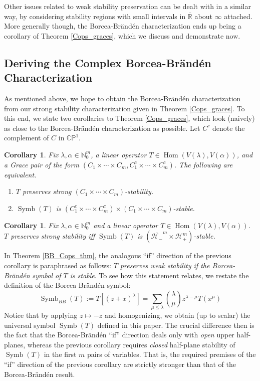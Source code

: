 \documentclass{article}
\newtheorem{corollary}[theorem]{Corollary}
\theoremstyle{definition}
\theoremstyle{plain}
\newcommand{\R}{\mathbb{R}}
\newcommand{\N}{\mathbb{N}}
\newcommand{\CP}{\mathbb{CP}}
\newcommand{\UHP}{\mathcal{H}_+}
\newcommand{\LHP}{\mathcal{H}_-}
\DeclareMathOperator{\Symb}{Symb}
\DeclareMathOperator{\Hom}{Hom}
\begin{document}
Other issues related to weak stability preservation can be dealt with in a similar way, by considering stability regions with small intervals in $\overline{\R}$ about $\infty$ attached. More generally though, the Borcea-Br{\"a}nd{\'e}n characterization ends up being a corollary of Theorem \ref{Cops_graces}, which we discuss and demonstrate now.

\subsection{Deriving the Complex Borcea-Br{\"a}nd{\'e}n Characterization}\label{Cops_deriv_subsect}

As mentioned above, we hope to obtain the Borcea-Br{\"a}nd{\'e}n characterization from our strong stability characterization given in Theorem \ref{Cops_graces}. To this end, we state two corollaries to Theorem \ref{Cops_graces}, which look (naively) as close to the Borcea-Br{\"a}nd{\'e}n characterization as possible. Let $C^c$ denote the complement of $C$ in $\CP^1$.

\begin{corollary}\label{naive_CBB_cor1}
    Fix $\lambda,\alpha \in \N_0^m$, a linear operator $T \in \Hom(V(\lambda),V(\alpha))$, and a Grace pair of the form $(C_1 \times \cdots \times C_m, C_1^c \times \cdots \times C_m^c)$. The following are equivalent.
    \begin{enumerate}[label=(\roman*)]
        \item $T$ preserves strong $(C_1 \times \cdots \times C_m)$-stability.
        \item $\Symb(T)$ is $(C_1^c \times \cdots \times C_m^c) \times (C_1 \times \cdots \times C_m)$-stable.
    \end{enumerate}
\end{corollary}

\begin{corollary}\label{naive_CBB_cor2}
    Fix $\lambda,\alpha \in \N_0^m$ and a linear operator $T \in \Hom(V(\lambda),V(\alpha))$. $T$ preserves strong stability iff $\Symb(T)$ is $(\overline{\LHP}^m \times \UHP^m)$-stable.
\end{corollary}

In Theorem \ref{BB_Cops_thm}, the analogous ``if'' direction of the previous corollary is paraphrased as follows: \emph{$T$ preserves weak stability if the Borcea-Br{\"a}nd{\'e}n symbol of $T$ is stable}. To see how this statement relates, we restate the definition of the Borcea-Br{\"a}nd{\'e}n symbol:
\[
    \Symb_{BB}(T) := T\left[(z+x)^\lambda\right] = \sum_{\mu \leq \lambda} \binom{\lambda}{\mu} z^{\lambda-\mu} T(x^\mu)
\]
Notice that by applying $z \mapsto -z$ and homogenizing, we obtain (up to scalar) the universal symbol $\Symb(T)$ defined in this paper. The crucial difference then is the fact that the Borcea-Br{\"a}nd{\'e}n ``if'' direction deals only with \emph{open} upper half-planes, whereas the previous corollary requires \emph{closed} half-plane stability of $\Symb(T)$ in the first $m$ pairs of variables. That is, the required premises of the ``if'' direction of the previous corollary are strictly stronger than that of the Borcea-Br{\"a}nd{\'e}n result.
\end{document}
